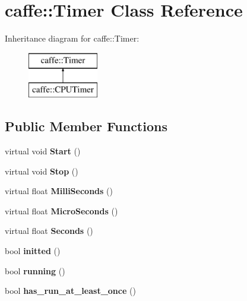 \hypertarget{classcaffe_1_1Timer}{}\section{caffe\+:\+:Timer Class Reference}
\label{classcaffe_1_1Timer}
Inheritance diagram for caffe\+:\+:Timer\+:\begin{figure}[H]
\begin{center}
\leavevmode
\includegraphics[height=2.000000cm]{classcaffe_1_1Timer}
\end{center}
\end{figure}
\subsection*{Public Member Functions}
\begin{DoxyCompactItemize}
\item 
virtual void {\bfseries Start} ()\hypertarget{classcaffe_1_1Timer_ae387bcee3008150e8d9a8b95a5ca279c}{}\label{classcaffe_1_1Timer_ae387bcee3008150e8d9a8b95a5ca279c}

\item 
virtual void {\bfseries Stop} ()\hypertarget{classcaffe_1_1Timer_ae99595b83e6ef8f1cfa4a933c359011b}{}\label{classcaffe_1_1Timer_ae99595b83e6ef8f1cfa4a933c359011b}

\item 
virtual float {\bfseries Milli\+Seconds} ()\hypertarget{classcaffe_1_1Timer_a236a04bd3da087fbd0d028977cce7a15}{}\label{classcaffe_1_1Timer_a236a04bd3da087fbd0d028977cce7a15}

\item 
virtual float {\bfseries Micro\+Seconds} ()\hypertarget{classcaffe_1_1Timer_a0cb08263942d10466d6a87b7a6e5b30b}{}\label{classcaffe_1_1Timer_a0cb08263942d10466d6a87b7a6e5b30b}

\item 
virtual float {\bfseries Seconds} ()\hypertarget{classcaffe_1_1Timer_a5a5c499062bb98600cc061575c58510a}{}\label{classcaffe_1_1Timer_a5a5c499062bb98600cc061575c58510a}

\item 
bool {\bfseries initted} ()\hypertarget{classcaffe_1_1Timer_a8f44fdd43378c9ef58471c6aae17c814}{}\label{classcaffe_1_1Timer_a8f44fdd43378c9ef58471c6aae17c814}

\item 
bool {\bfseries running} ()\hypertarget{classcaffe_1_1Timer_ae1a416ef3dfd11aefc73da5760bc98d7}{}\label{classcaffe_1_1Timer_ae1a416ef3dfd11aefc73da5760bc98d7}

\item 
bool {\bfseries has\+\_\+run\+\_\+at\+\_\+least\+\_\+once} ()\hypertarget{classcaffe_1_1Timer_ae06252439c4e1731a4c36b5a9810787c}{}\label{classcaffe_1_1Timer_ae06252439c4e1731a4c36b5a9810787c}

\end{DoxyCompactItemize}
